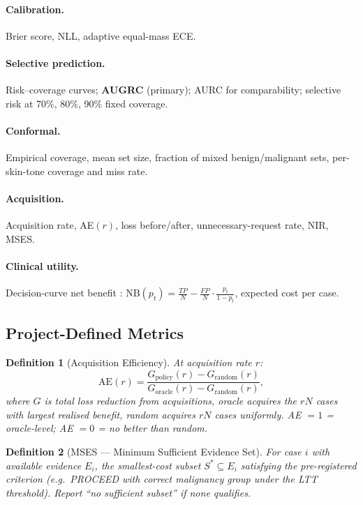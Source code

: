 \documentclass[conference]{IEEEtran}
\newtheorem{definition}{Definition}
\newcommand{\1}{\mathbf{1}}
\begin{document}
\paragraph{Calibration.} Brier score, NLL, adaptive equal-mass ECE.

\paragraph{Selective prediction.} Risk--coverage curves;
\textbf{AUGRC} (primary); AURC for comparability; selective risk at 70\%,
80\%, 90\% fixed coverage.

\paragraph{Conformal.} Empirical coverage, mean set size, fraction of
mixed benign/malignant sets, per-skin-tone coverage and miss rate.

\paragraph{Acquisition.} Acquisition rate, AE$(r)$, loss before/after,
unnecessary-request rate, NIR, MSES.

\paragraph{Clinical utility.}
Decision-curve net benefit \cite{vickers2006dca}:
$\text{NB}(p_t) = \frac{TP}{N} - \frac{FP}{N}\cdot\frac{p_t}{1-p_t}$,
expected cost per case.

\subsection{Project-Defined Metrics}

\begin{definition}[Acquisition Efficiency]
At acquisition rate $r$:
\begin{equation}
  \text{AE}(r) =
  \frac{G_{\text{policy}}(r) - G_{\text{random}}(r)}
       {G_{\text{oracle}}(r) - G_{\text{random}}(r)},
  \label{eq:ae}
\end{equation}
where $G$ is total loss reduction from acquisitions,
oracle acquires the $rN$ cases with largest realised benefit,
random acquires $rN$ cases uniformly.
AE $=1$ = oracle-level; AE $=0$ = no better than random.
\end{definition}

\begin{definition}[MSES --- Minimum Sufficient Evidence Set]
For case $i$ with available evidence $E_i$, the smallest-cost subset
$S^* \subseteq E_i$ satisfying the pre-registered criterion
(e.g.\ PROCEED with correct malignancy group under the LTT threshold).
Report ``no sufficient subset'' if none qualifies.
\end{definition}
\end{document}
